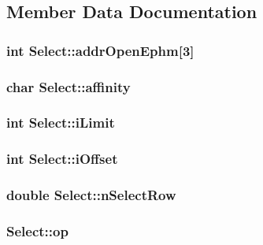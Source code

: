 \subsection{Member Data Documentation}
\hypertarget{struct_select_a5cad3b59bf1803be552d002e74bdfd47}{
\subsubsection[{addr\-Open\-Ephm}]{\setlength{\rightskip}{0pt plus 5cm}int Select\-::addr\-Open\-Ephm\mbox{[}3\mbox{]}}}\label{struct_select_a5cad3b59bf1803be552d002e74bdfd47}
\hypertarget{struct_select_a92417c2f75c710d2a7919b0d2e0b1d72}{
\subsubsection[{affinity}]{\setlength{\rightskip}{0pt plus 5cm}char Select\-::affinity}}\label{struct_select_a92417c2f75c710d2a7919b0d2e0b1d72}
\hypertarget{struct_select_abf68908bf029af42a32c60a2558a8b1e}{
\subsubsection[{i\-Limit}]{\setlength{\rightskip}{0pt plus 5cm}int Select\-::i\-Limit}}\label{struct_select_abf68908bf029af42a32c60a2558a8b1e}
\hypertarget{struct_select_ac12bebd00ed988df3ad1efb8e6c63fe4}{
\subsubsection[{i\-Offset}]{\setlength{\rightskip}{0pt plus 5cm}int Select\-::i\-Offset}}\label{struct_select_ac12bebd00ed988df3ad1efb8e6c63fe4}
\hypertarget{struct_select_a177125317478139f9ce834e4f7a93c52}{
\subsubsection[{n\-Select\-Row}]{\setlength{\rightskip}{0pt plus 5cm}double Select\-::n\-Select\-Row}}\label{struct_select_a177125317478139f9ce834e4f7a93c52}
\hypertarget{struct_select_a84506d61248313b5e10f7891cb7482be}{
\subsubsection[{op}]{ Select\-::op}}\label{struct_select_a84506d61248313b5e10f7891cb7482be}

